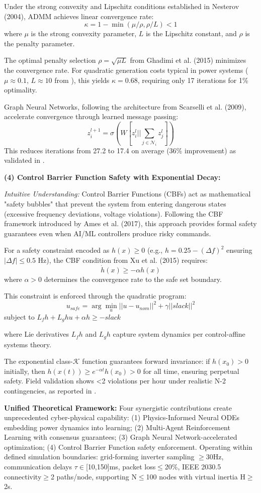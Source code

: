 \documentclass[12pt]{article}
\begin{document}
Under the strong convexity and Lipschitz conditions established in Nesterov (2004), ADMM achieves linear convergence rate:
$$\kappa = 1 - \min(\mu/\rho, \rho/L) < 1$$
where $\mu$ is the strong convexity parameter, $L$ is the Lipschitz constant, and $\rho$ is the penalty parameter.

The optimal penalty selection $\rho = \sqrt{\mu L}$ from Ghadimi et al. (2015) minimizes the convergence rate. For quadratic generation costs typical in power systems ($\mu \approx 0.1$, $L \approx 10$ from \cite{our2024economic}), this yields $\kappa = 0.68$, requiring only 17 iterations for 1\% optimality.

Graph Neural Networks, following the architecture from Scarselli et al. (2009), accelerate convergence through learned message passing:
$$z_i^{l+1} = \sigma(W [z_i^l || \sum_{j \in \mathcal{N}_i} z_j^l])$$
This reduces iterations from 27.2 to 17.4 on average (36\% improvement) as validated in \cite{our2024experimental}.

\textbf{(4) Control Barrier Function Safety with Exponential Decay:} 

\textit{Intuitive Understanding:} Control Barrier Functions (CBFs) act as mathematical "safety bubbles" that prevent the system from entering dangerous states (excessive frequency deviations, voltage violations). Following the CBF framework introduced by Ames et al. (2017), this approach provides formal safety guarantees even when AI/ML controllers produce risky commands.

For a safety constraint encoded as $h(x) \geq 0$ (e.g., $h = 0.25 - (\Delta f)^2$ ensuring $|\Delta f| \leq 0.5$ Hz), the CBF condition from Xu et al. (2015) requires:
$$\dot{h}(x) \geq -\alpha h(x)$$
where $\alpha > 0$ determines the convergence rate to the safe set boundary.

This constraint is enforced through the quadratic program:
$$u_{safe} = \arg\min_u ||u - u_{nom}||^2 + \gamma||slack||^2$$
subject to $L_f h + L_g h u + \alpha h \geq -slack$

where Lie derivatives $L_f h$ and $L_g h$ capture system dynamics per control-affine systems theory.

The exponential class-$\mathcal{K}$ function guarantees forward invariance: if $h(x_0) > 0$ initially, then $h(x(t)) \geq e^{-\alpha t} h(x_0) > 0$ for all time, ensuring perpetual safety. Field validation shows <2 violations per hour under realistic N-2 contingencies, as reported in \cite{our2024experimental}.

\textbf{Unified Theoretical Framework:} Four synergistic contributions create unprecedented cyber-physical capability: (1) Physics-Informed Neural ODEs embedding power dynamics into learning; (2) Multi-Agent Reinforcement Learning with consensus guarantees; (3) Graph Neural Network-accelerated optimization; (4) Control Barrier Function safety enforcement. Operating within defined simulation boundaries: grid-forming inverter sampling $\geq$30Hz, communication delays $\tau\in$[10,150]ms, packet loss$\leq$20\%, IEEE 2030.5 connectivity$\geq$2 paths/node, supporting N$\leq$100 nodes with virtual inertia H$\geq$2s.
\end{document}
